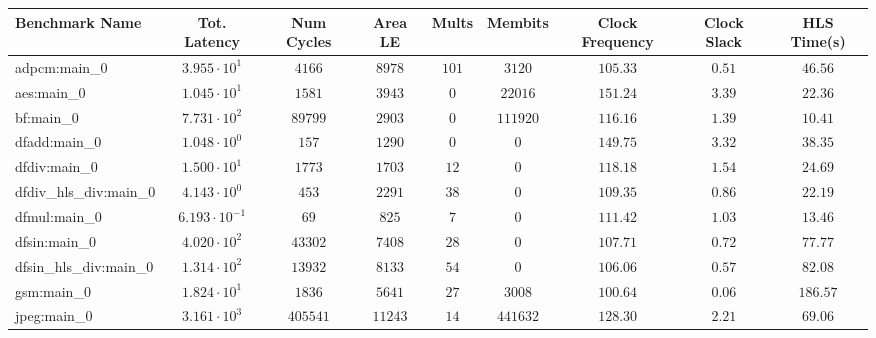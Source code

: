 \begin{tabular}{|l|c|c|c|c|c|c|c|c|}
\hline
Benchmark Name          & Tot. Latency            & Num Cycles & Area LE   & Mults   & Membits    & Clock Frequency & Clock Slack & HLS Time(s) \\
\hline
adpcm:main\_0           & $ 3.955 \cdot 10^{1}  $ & $ 4166   $ & $ 8978  $ & $ 101 $ & $ 3120   $ & $ 105.33      $ & $ 0.51    $ & $ 46.56   $ \\
aes:main\_0             & $ 1.045 \cdot 10^{1}  $ & $ 1581   $ & $ 3943  $ & $ 0   $ & $ 22016  $ & $ 151.24      $ & $ 3.39    $ & $ 22.36   $ \\
bf:main\_0              & $ 7.731 \cdot 10^{2}  $ & $ 89799  $ & $ 2903  $ & $ 0   $ & $ 111920 $ & $ 116.16      $ & $ 1.39    $ & $ 10.41   $ \\
dfadd:main\_0           & $ 1.048 \cdot 10^{0}  $ & $ 157    $ & $ 1290  $ & $ 0   $ & $ 0      $ & $ 149.75      $ & $ 3.32    $ & $ 38.35   $ \\
dfdiv:main\_0           & $ 1.500 \cdot 10^{1}  $ & $ 1773   $ & $ 1703  $ & $ 12  $ & $ 0      $ & $ 118.18      $ & $ 1.54    $ & $ 24.69   $ \\
dfdiv\_hls\_div:main\_0 & $ 4.143 \cdot 10^{0}  $ & $ 453    $ & $ 2291  $ & $ 38  $ & $ 0      $ & $ 109.35      $ & $ 0.86    $ & $ 22.19   $ \\
dfmul:main\_0           & $ 6.193 \cdot 10^{-1} $ & $ 69     $ & $ 825   $ & $ 7   $ & $ 0      $ & $ 111.42      $ & $ 1.03    $ & $ 13.46   $ \\
dfsin:main\_0           & $ 4.020 \cdot 10^{2}  $ & $ 43302  $ & $ 7408  $ & $ 28  $ & $ 0      $ & $ 107.71      $ & $ 0.72    $ & $ 77.77   $ \\
dfsin\_hls\_div:main\_0 & $ 1.314 \cdot 10^{2}  $ & $ 13932  $ & $ 8133  $ & $ 54  $ & $ 0      $ & $ 106.06      $ & $ 0.57    $ & $ 82.08   $ \\
gsm:main\_0             & $ 1.824 \cdot 10^{1}  $ & $ 1836   $ & $ 5641  $ & $ 27  $ & $ 3008   $ & $ 100.64      $ & $ 0.06    $ & $ 186.57  $ \\
jpeg:main\_0            & $ 3.161 \cdot 10^{3}  $ & $ 405541 $ & $ 11243 $ & $ 14  $ & $ 441632 $ & $ 128.30      $ & $ 2.21    $ & $ 69.06   $ \\

\end{tabular}

